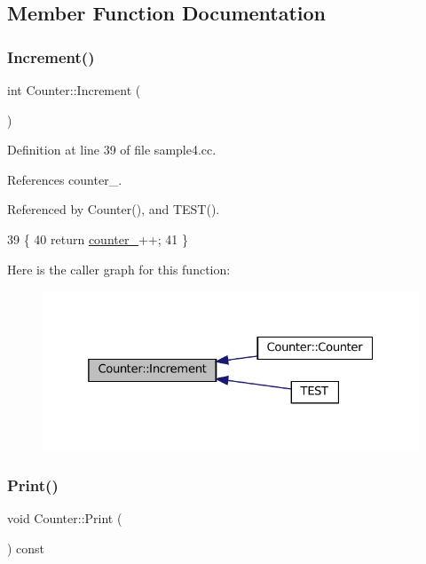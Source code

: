 \subsection{Member Function Documentation}
\mbox{\label{classCounter_a0a0ca9fdb580a2aec9a5a62ebed2b5ab}} 
\subsubsection{\texorpdfstring{Increment()}{Increment()}}
{\footnotesize\ttfamily int Counter\+::\+Increment (\begin{DoxyParamCaption}{ }\end{DoxyParamCaption})}



Definition at line 39 of file sample4.\+cc.



References counter\+\_\+.



Referenced by Counter(), and T\+E\+S\+T().


\begin{DoxyCode}
39                        \{
40   \textcolor{keywordflow}{return} \hyperlink{classCounter_abdef0bf73f0a68177863c42c6eba2fc0}{counter\_}++;
41 \}
\end{DoxyCode}
Here is the caller graph for this function\+:
\nopagebreak
\begin{figure}[H]
\begin{center}
\leavevmode
\includegraphics[width=325pt]{classCounter_a0a0ca9fdb580a2aec9a5a62ebed2b5ab_icgraph}
\end{center}
\end{figure}
\mbox{\label{classCounter_a80092ec2a0deea0870b2e9f8ad0906bd}} 
\subsubsection{\texorpdfstring{Print()}{Print()}}
{\footnotesize\ttfamily void Counter\+::\+Print (\begin{DoxyParamCaption}{ }\end{DoxyParamCaption}) const}



